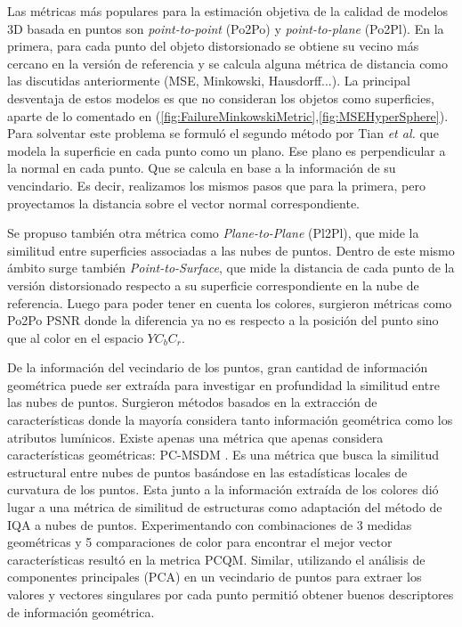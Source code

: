 Las métricas más populares para la estimación objetiva de la calidad de modelos 
3D basada en puntos son \emph{point-to-point} (Po2Po)\cite{PointToPoint} y
\emph{point-to-plane} (Po2Pl)\cite{PointToPlane}. 
En la primera, para cada punto del objeto distorsionado se obtiene su vecino más cercano en la versión de referencia y 
se calcula alguna métrica de distancia como las discutidas anteriormente (MSE, Minkowski, Hausdorff...). 
La principal desventaja de estos modelos es que no consideran los objetos como 
superficies, aparte de lo comentado en (\ref{fig:FailureMinkowskiMetric},\ref{fig:MSEHyperSphere}).
Para solventar este problema se formuló el segundo método por Tian \emph{et al.} 
que modela la superficie en cada punto como un plano. Ese plano es perpendicular a 
la normal en cada punto. Que se calcula en base a la información de su vencindario. Es decir, 
realizamos los mismos pasos que para la primera, pero proyectamos la distancia sobre 
el vector normal correspondiente. 

Se propuso también otra métrica como \emph{Plane-to-Plane} (Pl2Pl)\cite{PlaneToPlane}, 
que mide la similitud entre superficies associadas a las nubes de puntos. Dentro 
de este mismo ámbito surge también \emph{Point-to-Surface}\cite{PlaneToSurface}, 
que mide la distancia de cada punto de la versión distorsionado respecto a su 
superficie correspondiente en la nube de referencia. Luego para poder tener en
cuenta los colores, surgieron métricas como Po2Po PSNR\cite{PSNR} donde la diferencia 
ya no es respecto a la posición del punto sino que al color en el espacio $YC_bC_r$.

De la información del vecindario de los puntos, gran cantidad de información geométrica 
puede ser extraída para investigar en profundidad la similitud entre las nubes 
de puntos. Surgieron métodos basados en la extracción de características donde la 
mayoría considera tanto información geométrica como los atributos lumínicos.
Existe apenas una métrica que apenas considera características geométricas: PC-MSDM \cite{PC-MSDM}. 
Es una métrica que busca la similitud estructural entre nubes de puntos basándose en
las estadísticas locales de curvatura de los puntos. Esta junto a la información 
extraída de los colores dió lugar a una métrica de similitud de estructuras\cite{PointSSIM}
como adaptación del método \cite{StructuralSimilarityIndex} de IQA a nubes de puntos\cite{SSIM}.  Experimentando con combinaciones de 3 medidas geométricas y 5 comparaciones de color 
para encontrar el mejor vector características resultó en la metrica PCQM\cite{PCQM}.
Similar, utilizando el análisis de componentes principales (PCA) en un vecindario 
de puntos para extraer los valores y vectores singulares por cada punto permitió 
obtener buenos descriptores de información geométrica\cite{PointPCA}.

